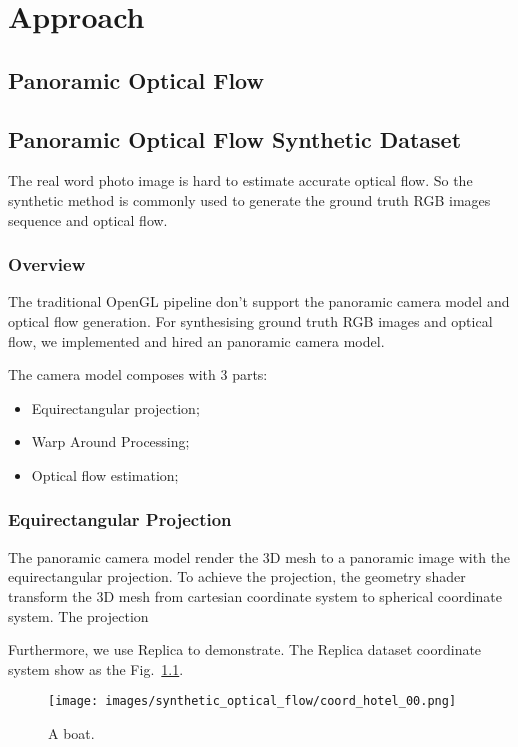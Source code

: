 

\chapter{Approach}

\section{Panoramic Optical Flow}


\section{Panoramic Optical Flow Synthetic Dataset}

The real word photo image is hard to estimate accurate optical flow.
So the synthetic method is commonly used to generate the ground truth RGB images sequence and optical flow.


\subsection{Overview}

The traditional OpenGL pipeline don't support the panoramic camera model and optical flow generation.
For synthesising ground truth RGB images and optical flow, we implemented and hired an panoramic camera model.

The camera model composes with 3 parts:
\begin{itemize}
	\item Equirectangular projection;
	\item Warp Around Processing;
	\item Optical flow estimation;
\end{itemize}

\subsection{Equirectangular Projection}

The panoramic camera model render the 3D mesh to a panoramic image with the equirectangular projection.
To achieve the projection, the geometry shader transform the 3D mesh from cartesian coordinate system to spherical coordinate system.
The projection 

Furthermore, we use Replica to demonstrate. 
The Replica dataset coordinate system show as the Fig.~\ref{fig:approach:coord_hotel_00}.

\begin{figure}[hbt!]
	\centering
	\texttt{[image: images/synthetic\_optical\_flow/coord\_hotel\_00.png]}
	\caption{A boat.}
	\label{fig:approach:coord_hotel_00}
\end{figure}

